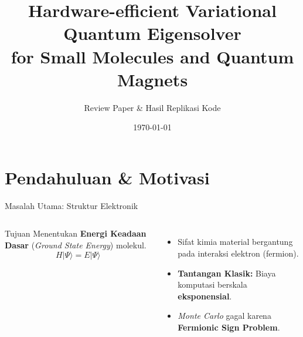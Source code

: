 \documentclass[aspectratio=169, 10pt]{beamer}
\title[Hardware-Efficient VQE]{Hardware-efficient Variational Quantum Eigensolver\\for Small Molecules and Quantum Magnets}
\subtitle{Review Paper \& Hasil Replikasi Kode}
\date{\today}
\begin{document}

\begin{frame}
    \titlepage
\end{frame}

\section{Pendahuluan \& Motivasi}

\begin{frame}{Masalah Utama: Struktur Elektronik}
    \begin{columns}
        \begin{block}{Tujuan}
            Menentukan \textbf{Energi Keadaan Dasar} (\textit{Ground State Energy}) molekul.
            $$ H |\Psi\rangle = E |\Psi\rangle $$
        \end{block}
        \vspace{0.5em}
        \begin{itemize}
            \item Sifat kimia material bergantung pada interaksi elektron (fermion).
            \item \textbf{Tantangan Klasik:} Biaya komputasi berskala \textbf{eksponensial}.
            \item \textit{Monte Carlo} gagal karena \textbf{Fermionic Sign Problem}.
        \end{itemize}

        \centering
    \end{columns}
\end{frame}
\end{document}

